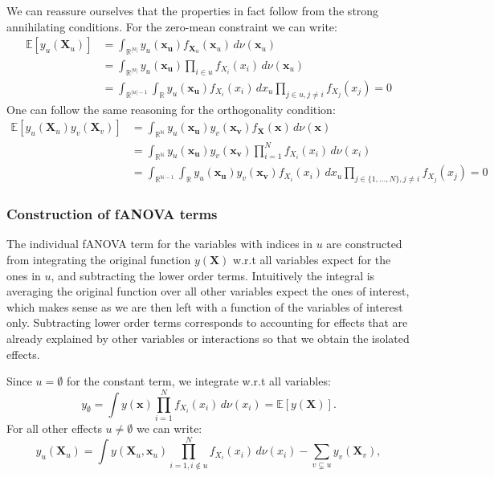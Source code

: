 We can reassure ourselves that the properties in fact follow from the strong annihilating conditions. For the zero-mean constraint we can write:
\begin{align*}
    \mathbb{E}[y_u(\boldsymbol{X}_u)] &= \int_{\mathbb{R}^{|u|}} y_u(\boldsymbol{x_u}) f_{\boldsymbol{X}_u}(\boldsymbol{x}_u) \, d\nu (\boldsymbol{x}_u) \\
    &= \int_{\mathbb{R}^{|u|}} y_u(\boldsymbol{x_u}) \prod_{i \in u} f_{X_i}(x_i) \, d\nu (\boldsymbol{x}_u) \\
    &= \int_{\mathbb{R}^{|u|-1}} \int_{\mathbb{R}} y_u(\boldsymbol{x_u}) f_{X_i}(x_i) \, dx_u \prod_{j \in u, j \neq i} f_{X_j}(x_j) = 0
\end{align*}
One can follow the same reasoning for the orthogonality condition:
\begin{align*}
    \mathbb{E}[y_u(\boldsymbol{X}_u) y_v(\boldsymbol{X}_v)] &= \int_{\mathbb{R}^{\mathbb{N}}} y_u(\boldsymbol{x_u}) y_v(\boldsymbol{x_v}) f_{\boldsymbol{X}}(\boldsymbol{x}) \, d\nu (\boldsymbol{x}) \\
    &= \int_{\mathbb{R}^{\mathbb{N}}} y_u(\boldsymbol{x_u}) y_v(\boldsymbol{x_v}) \prod_{i=1}^{N} f_{X_i}(x_i) \, d\nu (x_i) \\
    &= \int_{\mathbb{R}^{\mathbb{N}-1}} \int_{\mathbb{R}} y_u(\boldsymbol{x_u}) y_v(\boldsymbol{x_v}) f_{X_i}(x_i) \, dx_u \prod_{j \in \{1, \dots, N\}, j \neq i} f_{X_j}(x_j) = 0
\end{align*}


\subsubsection*{Construction of fANOVA terms}
The individual fANOVA term for the variables with indices in $u$ are constructed from integrating the original function $y(\boldsymbol{X})$ w.r.t all variables expect for the ones in $u$, and subtracting the lower order terms. Intuitively the integral is averaging the original function over all other variables expect the ones of interest, which makes sense as we are then left with a function of the variables of interest only. Subtracting lower order terms corresponds to accounting for effects that are already explained by other variables or interactions so that we obtain the isolated effects.\par
Since $u = \emptyset$ for the constant term, we integrate w.r.t all variables:
\begin{equation}
    y_{\emptyset} = \int y(\boldsymbol{x}) \prod_{i=1}^{N} f_{X_i}(x_i) \, d\nu (x_i) = \mathbb{E}[y(\boldsymbol{X})].
    \label{eq:intercept}
\end{equation}
For all other effects $u \neq \emptyset$ we can write:
\begin{equation}
    y_u(\boldsymbol{X}_u) = \int y(\boldsymbol{X}_u, \boldsymbol{x}_u) \prod_{i=1, i \notin u}^{N} f_{X_i}(x_i) \, d\nu (x_i)- \sum_{v \subsetneq u} y_v(\boldsymbol{X}_v),
    \label{eq:fanova_component}
\end{equation}

